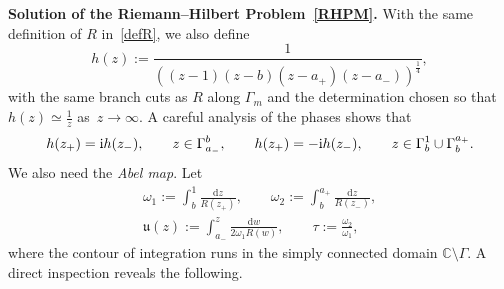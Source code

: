 \documentclass[10pt,a4paper]{amsart}
\numberwithin{equation}{section}
\theoremstyle{definition}
\def\Abel{\mathfrak u}
\def\le{\left}
\def\ri{\right}
\def \d{{\mathrm d}}
\def\be{\begin{equation}}
\def\ee{\end{equation}}
\def\C{{\mathbb C}}
\begin{document}
{\bf Solution of the Riemann--Hilbert Problem~\ref{RHPM}.}
With the same definition of $R$ in~\eqref{defR}, we also define
\be
h(z):= \frac 1 {\le((z-1)(z-b)(z-a_+)(z-a_-)\ri)^\frac 1 4},
\label{defh}
\ee
with the same branch cuts as $R$ along $\Gamma_m$ and the determination chosen so that $h(z) \simeq \frac 1 z $ as~${z\to \infty}$.
A careful analysis of the phases shows that
\begin{gather}
\label{hjumps}
h(z_+) ={\rm i} h(z_-),\qquad z\in \Gamma_{a_-}^b,\qquad
h(z_+) =-{\rm i} h(z_-), \qquad z\in \Gamma_b^1\cup \Gamma_b^{a_+}.
\end{gather}
We also need the \emph{Abel map}. Let
\begin{gather}
\label{defomega12}
\omega_1:= \int_b^1 \frac {\d z}{R(z_+)}, \qquad \omega_2:= \int_b^{a_+} \frac {\d z}{R(z_-)},\\
\label{defAbel}
\Abel(z):= \int_{a_-}^z \frac {\d w}{2\omega_1 R(w)}, \qquad \tau:= \frac {\omega_2}{\omega_1},
\end{gather}
where the contour of integration runs in the simply connected domain $\C\setminus \Gamma $.
A direct inspection reveals the following.
\end{document}
